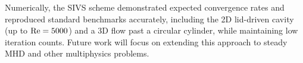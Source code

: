 \documentclass[3p]{elsarticle}
\begin{document}
Numerically, the SIVS scheme demonstrated expected convergence rates and reproduced standard benchmarks accurately, including the 2D lid-driven cavity (up to ${\rm Re} = 5000$) and a 3D flow past a circular cylinder, while maintaining low iteration counts.  Future work will focus on extending this approach to steady MHD and other multiphysics problems.


%

%
%
\end{document}
